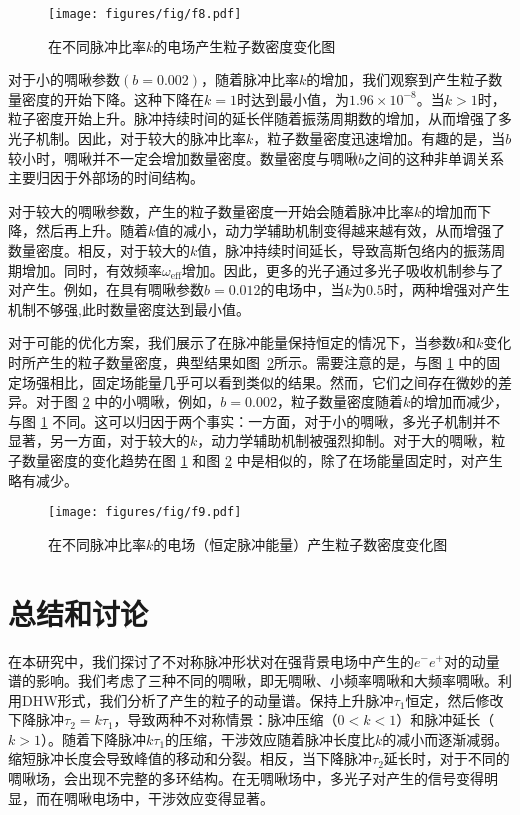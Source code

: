 \begin{figure}
  \centering
  \texttt{[image: figures/fig/f8.pdf]}
  \caption{在不同脉冲比率$k$的电场产生粒子数密度变化图}
  \label{8}
\end{figure}

对于小的啁啾参数$(b = 0.002)$，随着脉冲比率$k$的增加，我们观察到产生粒子数量密度的开始下降。这种下降在$k = 1$时达到最小值，为$1.96 \times 10^{-8}$。当$k> 1$时，粒子密度开始上升。脉冲持续时间的延长伴随着振荡周期数的增加，从而增强了多光子机制。因此，对于较大的脉冲比率$k$，粒子数量密度迅速增加。有趣的是，当$b$较小时，啁啾并不一定会增加数量密度。数量密度与啁啾$b$之间的这种非单调关系主要归因于外部场的时间结构。

对于较大的啁啾参数，产生的粒子数量密度一开始会随着脉冲比率$k$的增加而下降，然后再上升。随着$k$值的减小，动力学辅助机制变得越来越有效，从而增强了数量密度。相反，对于较大的$k$值，脉冲持续时间延长，导致高斯包络内的振荡周期增加。同时，有效频率$\omega_{\text{eff}}$增加。因此，更多的光子通过多光子吸收机制参与了对产生。例如，在具有啁啾参数$b = 0.012$的电场中，当$k$为$0.5$时，两种增强对产生机制不够强,此时数量密度达到最小值。

对于可能的优化方案，我们展示了在脉冲能量保持恒定的情况下，当参数$b$和$k$变化时所产生的粒子数量密度，典型结果如图~\ref{9}所示。需要注意的是，与图 \ref{8} 中的固定场强相比，固定场能量几乎可以看到类似的结果。然而，它们之间存在微妙的差异。对于图 \ref{9} 中的小啁啾，例如，$b=0.002$，粒子数量密度随着$k$的增加而减少，与图 \ref{8} 不同。这可以归因于两个事实：一方面，对于小的啁啾，多光子机制并不显著，另一方面，对于较大的$k$，动力学辅助机制被强烈抑制。对于大的啁啾，粒子数量密度的变化趋势在图 \ref{8} 和图 \ref{9} 中是相似的，除了在场能量固定时，对产生略有减少。

\begin{figure}
  \centering
  \texttt{[image: figures/fig/f9.pdf]}
  \caption{在不同脉冲比率$k$的电场（恒定脉冲能量）产生粒子数密度变化图}
  \label{9}
\end{figure}

\section{总结和讨论}\label{conclusion}

在本研究中，我们探讨了不对称脉冲形状对在强背景电场中产生的$e^{-}e^{+}$对的动量谱的影响。我们考虑了三种不同的啁啾，即无啁啾、小频率啁啾和大频率啁啾。利用DHW形式，我们分析了产生的粒子的动量谱。保持上升脉冲$\tau_1$恒定，然后修改下降脉冲$\tau_2 = k \tau_1$，导致两种不对称情景：脉冲压缩（$0< k< 1$）和脉冲延长（$k>1$）。随着下降脉冲$k \tau_1$的压缩，干涉效应随着脉冲长度比$k$的减小而逐渐减弱。缩短脉冲长度会导致峰值的移动和分裂。相反，当下降脉冲$\tau_2$延长时，对于不同的啁啾场，会出现不完整的多环结构。在无啁啾场中，多光子对产生的信号变得明显，而在啁啾电场中，干涉效应变得显著。

